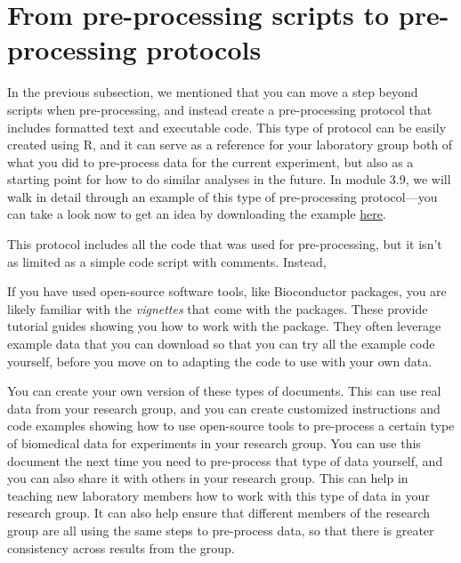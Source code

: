\documentclass[]{tufte-book}
\begin{document}
\hypertarget{from-pre-processing-scripts-to-pre-processing-protocols}{%
\section{From pre-processing scripts to pre-processing protocols}\label{from-pre-processing-scripts-to-pre-processing-protocols}}

In the previous subsection, we mentioned that you can move a step beyond scripts
when pre-processing, and instead create a pre-processing protocol that includes
formatted text and executable code. This type of protocol can be easily created
using R, and it can serve as a reference for your laboratory group both of what
you did to pre-process data for the current experiment, but also as a starting
point for how to do similar analyses in the future. In module 3.9, we will walk
in detail through an example of this type of pre-processing protocol---you can
take a look now to get an idea by downloading the example
\href{https://github.com/geanders/improve_repro/raw/master/data/bactcountr_example_data/example_protocol.pdf}{here}.

This protocol includes all the code that was used for pre-processing, but it
isn't as limited as a simple code script with comments. Instead,

If you have used open-source software tools, like Bioconductor packages, you
are likely familiar with the \emph{vignettes} that come with the packages. These
provide tutorial guides showing you how to work with the package. They often
leverage example data that you can download so that you can try all the
example code yourself, before you move on to adapting the code to use with
your own data.

You can create your own version of these types of documents. This can use
real data from your research group, and you can create customized instructions
and code examples showing how to use open-source tools to pre-process a
certain type of biomedical data for experiments in your research group.
You can use this document the next time you need to pre-process that type
of data yourself, and you can also share it with others in your research
group. This can help in teaching new laboratory members how to work with
this type of data in your research group. It can also help ensure that
different members of the research group are all using the same steps to
pre-process data, so that there is greater consistency across results from
the group.
\end{document}

